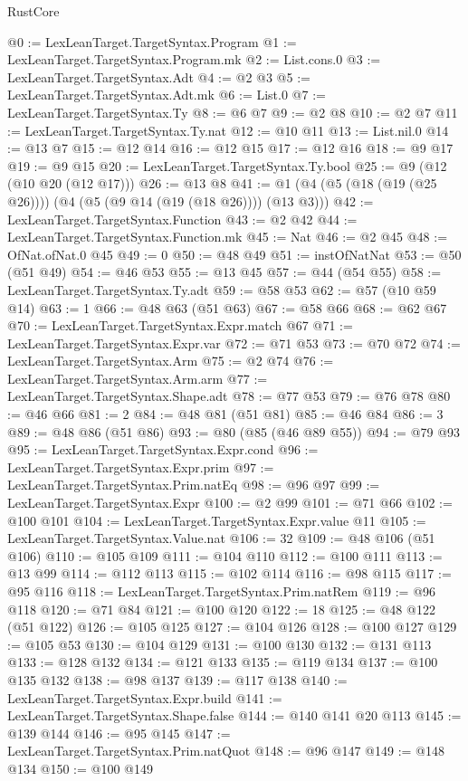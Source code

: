 \begin{lexlean}{RustCore}
\begin{coremodule}
@0 := LexLeanTarget.TargetSyntax.Program
@1 := LexLeanTarget.TargetSyntax.Program.mk
@2 := List.cons.{0}
@3 := LexLeanTarget.TargetSyntax.Adt
@4 := @2 @3
@5 := LexLeanTarget.TargetSyntax.Adt.mk
@6 := List.{0}
@7 := LexLeanTarget.TargetSyntax.Ty
@8 := @6 @7
@9 := @2 @8
@10 := @2 @7
@11 := LexLeanTarget.TargetSyntax.Ty.nat
@12 := @10 @11
@13 := List.nil.{0}
@14 := @13 @7
@15 := @12 @14
@16 := @12 @15
@17 := @12 @16
@18 := @9 @17
@19 := @9 @15
@20 := LexLeanTarget.TargetSyntax.Ty.bool
@25 := @9 (@12 (@10 @20 (@12 @17)))
@26 := @13 @8
@41 := @1 (@4 (@5 (@18 (@19 (@25 @26)))) (@4 (@5 (@9 @14 (@19 (@18 @26)))) (@13 @3)))
@42 := LexLeanTarget.TargetSyntax.Function
@43 := @2 @42
@44 := LexLeanTarget.TargetSyntax.Function.mk
@45 := Nat
@46 := @2 @45
@48 := OfNat.ofNat.{0} @45
@49 := 0
@50 := @48 @49
@51 := instOfNatNat
@53 := @50 (@51 @49)
@54 := @46 @53
@55 := @13 @45
@57 := @44 (@54 @55)
@58 := LexLeanTarget.TargetSyntax.Ty.adt
@59 := @58 @53
@62 := @57 (@10 @59 @14)
@63 := 1
@66 := @48 @63 (@51 @63)
@67 := @58 @66
@68 := @62 @67
@70 := LexLeanTarget.TargetSyntax.Expr.match @67
@71 := LexLeanTarget.TargetSyntax.Expr.var
@72 := @71 @53
@73 := @70 @72
@74 := LexLeanTarget.TargetSyntax.Arm
@75 := @2 @74
@76 := LexLeanTarget.TargetSyntax.Arm.arm
@77 := LexLeanTarget.TargetSyntax.Shape.adt
@78 := @77 @53
@79 := @76 @78
@80 := @46 @66
@81 := 2
@84 := @48 @81 (@51 @81)
@85 := @46 @84
@86 := 3
@89 := @48 @86 (@51 @86)
@93 := @80 (@85 (@46 @89 @55))
@94 := @79 @93
@95 := LexLeanTarget.TargetSyntax.Expr.cond
@96 := LexLeanTarget.TargetSyntax.Expr.prim
@97 := LexLeanTarget.TargetSyntax.Prim.natEq
@98 := @96 @97
@99 := LexLeanTarget.TargetSyntax.Expr
@100 := @2 @99
@101 := @71 @66
@102 := @100 @101
@104 := LexLeanTarget.TargetSyntax.Expr.value @11
@105 := LexLeanTarget.TargetSyntax.Value.nat
@106 := 32
@109 := @48 @106 (@51 @106)
@110 := @105 @109
@111 := @104 @110
@112 := @100 @111
@113 := @13 @99
@114 := @112 @113
@115 := @102 @114
@116 := @98 @115
@117 := @95 @116
@118 := LexLeanTarget.TargetSyntax.Prim.natRem
@119 := @96 @118
@120 := @71 @84
@121 := @100 @120
@122 := 18
@125 := @48 @122 (@51 @122)
@126 := @105 @125
@127 := @104 @126
@128 := @100 @127
@129 := @105 @53
@130 := @104 @129
@131 := @100 @130
@132 := @131 @113
@133 := @128 @132
@134 := @121 @133
@135 := @119 @134
@137 := @100 @135 @132
@138 := @98 @137
@139 := @117 @138
@140 := LexLeanTarget.TargetSyntax.Expr.build
@141 := LexLeanTarget.TargetSyntax.Shape.false
@144 := @140 @141 @20 @113
@145 := @139 @144
@146 := @95 @145
@147 := LexLeanTarget.TargetSyntax.Prim.natQuot
@148 := @96 @147
@149 := @148 @134
@150 := @100 @149

\end{coremodule}
\end{lexlean}
